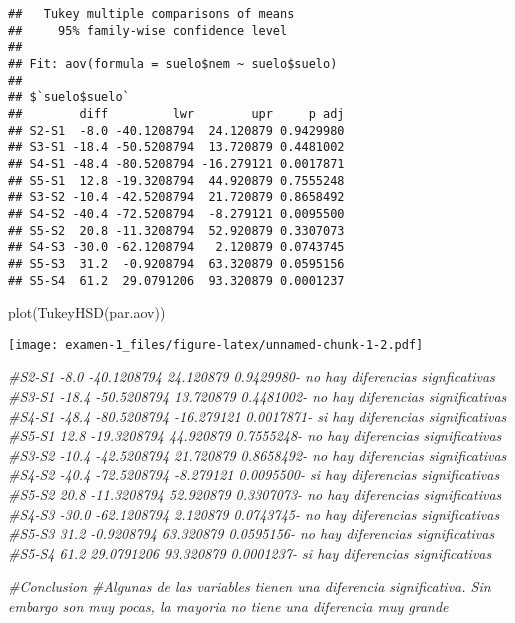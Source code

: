 \documentclass[
]{article}
\newenvironment{Shaded}{\begin{snugshade}}{\end{snugshade}}
\newcommand{\CommentTok}[1]{\textcolor[rgb]{0.56,0.35,0.01}{\textit{#1}}}
\newcommand{\FunctionTok}[1]{\textcolor[rgb]{0.00,0.00,0.00}{#1}}
\newcommand{\NormalTok}[1]{#1}
\begin{document}
\begin{verbatim}
##   Tukey multiple comparisons of means
##     95% family-wise confidence level
## 
## Fit: aov(formula = suelo$nem ~ suelo$suelo)
## 
## $`suelo$suelo`
##        diff         lwr        upr     p adj
## S2-S1  -8.0 -40.1208794  24.120879 0.9429980
## S3-S1 -18.4 -50.5208794  13.720879 0.4481002
## S4-S1 -48.4 -80.5208794 -16.279121 0.0017871
## S5-S1  12.8 -19.3208794  44.920879 0.7555248
## S3-S2 -10.4 -42.5208794  21.720879 0.8658492
## S4-S2 -40.4 -72.5208794  -8.279121 0.0095500
## S5-S2  20.8 -11.3208794  52.920879 0.3307073
## S4-S3 -30.0 -62.1208794   2.120879 0.0743745
## S5-S3  31.2  -0.9208794  63.320879 0.0595156
## S5-S4  61.2  29.0791206  93.320879 0.0001237
\end{verbatim}

\begin{Shaded}
\begin{Highlighting}[]
\FunctionTok{plot}\NormalTok{(}\FunctionTok{TukeyHSD}\NormalTok{(par.aov))}
\end{Highlighting}
\end{Shaded}

\texttt{[image: examen-1\_files/figure-latex/unnamed-chunk-1-2.pdf]}

\begin{Shaded}
\begin{Highlighting}[]
\CommentTok{\#S2{-}S1  {-}8.0 {-}40.1208794  24.120879 0.9429980{-} no hay diferencias signficativas}
\CommentTok{\#S3{-}S1 {-}18.4 {-}50.5208794  13.720879 0.4481002{-} no hay diferencias significativas}
\CommentTok{\#S4{-}S1 {-}48.4 {-}80.5208794 {-}16.279121 0.0017871{-} si hay diferencias significativas }
\CommentTok{\#S5{-}S1  12.8 {-}19.3208794  44.920879 0.7555248{-} no hay diferencias significativas}
\CommentTok{\#S3{-}S2 {-}10.4 {-}42.5208794  21.720879 0.8658492{-} no hay diferencias significativas}
\CommentTok{\#S4{-}S2 {-}40.4 {-}72.5208794  {-}8.279121 0.0095500{-} si hay diferencias significativas}
\CommentTok{\#S5{-}S2  20.8 {-}11.3208794  52.920879 0.3307073{-} no hay diferencias significativas}
\CommentTok{\#S4{-}S3 {-}30.0 {-}62.1208794   2.120879 0.0743745{-} no hay diferencias significativas}
\CommentTok{\#S5{-}S3  31.2  {-}0.9208794  63.320879 0.0595156{-} no hay diferencias significativas}
\CommentTok{\#S5{-}S4  61.2  29.0791206  93.320879 0.0001237{-} si hay diferencias significativas }



\CommentTok{\#Conclusion}
\CommentTok{\#Algunas de las variables tienen una diferencia significativa. Sin embargo son muy pocas, la mayoria no tiene una diferencia muy grande }
\end{Highlighting}
\end{Shaded}
\end{document}
